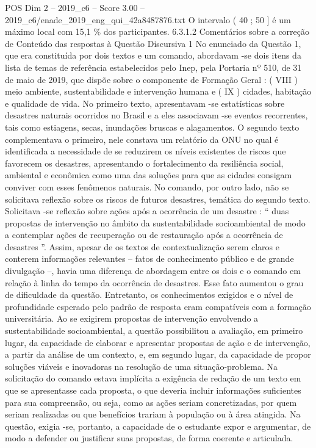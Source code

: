 \begin{textsample}{POS Dim 2 – 2019\_c6 – Score 3.00 – 2019\_c6/enade\_2019\_eng\_qui\_42a8487876.txt}
O intervalo ( 40 ; 50 ] é um máximo local com 15,1 \% dos participantes. 6.3.1.2 Comentários sobre a correção de Conteúdo das respostas à Questão Discursiva 1 No enunciado da Questão 1, que era constituída por dois textos e um comando, abordavam -se dois itens da lista de temas de referência estabelecidos pelo Inep, pela Portaria nº 510, de 31 de maio de 2019, que dispõe sobre o componente de Formação Geral : ( VIII ) meio ambiente, sustentabilidade e intervenção humana e ( IX ) cidades, habitação e qualidade de vida.
No primeiro texto, apresentavam -se estatísticas sobre desastres naturais ocorridos no Brasil e a eles associavam -se eventos recorrentes, tais como estiagens, secas, inundações bruscas e alagamentos.
O segundo texto complementava o primeiro, nele constava um relatório da ONU no qual é identificada a necessidade de se reduzirem os níveis existentes de riscos que favorecem os desastres, apresentando o fortalecimento da resiliência social, ambiental e econômica como uma das soluções para que as cidades consigam conviver com esses fenômenos naturais.
No comando, por outro lado, não se solicitava reflexão sobre os riscos de futuros desastres, temática do segundo texto.
Solicitava -se reflexão sobre ações após a ocorrência de um desastre : “ duas propostas de intervenção no âmbito da sustentabilidade socioambiental de modo a contemplar ações de recuperação ou de restauração após a ocorrência de desastres ”.
Assim, apesar de os textos de contextualização serem claros e conterem informações relevantes – fatos de conhecimento público e de grande divulgação –, havia uma diferença de abordagem entre os dois e o comando em relação à linha do tempo da ocorrência de desastres.
Esse fato aumentou o grau de dificuldade da questão.
Entretanto, os conhecimentos exigidos e o nível de profundidade esperado pelo padrão de resposta eram compatíveis com a formação universitária.
Ao se exigirem propostas de intervenção envolvendo a sustentabilidade socioambiental, a questão possibilitou a avaliação, em primeiro lugar, da capacidade de elaborar e apresentar propostas de ação e de intervenção, a partir da análise de um contexto, e, em segundo lugar, da capacidade de propor soluções viáveis e inovadoras na resolução de uma situação-problema.
Na solicitação do comando estava implícita a exigência de redação de um texto em que se apresentasse cada proposta, o que deveria incluir informações suficientes para sua compreensão, ou seja, como as ações seriam concretizadas, por quem seriam realizadas ou que benefícios trariam à população ou à área atingida.
Na questão, exigia -se, portanto, a capacidade de o estudante expor e argumentar, de modo a defender ou justificar suas propostas, de forma coerente e articulada.

\end{textsample}
